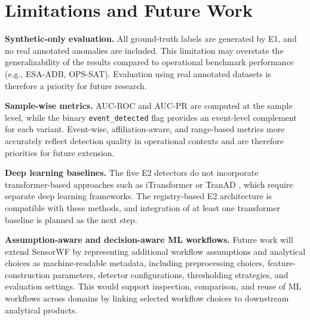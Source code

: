 \documentclass[conference]{IEEEtran}
\begin{document}

\section{Limitations and Future Work}
\label{sec:limitations}

\textbf{Synthetic-only evaluation.} All ground-truth labels are generated by E1, and no real annotated anomalies are included. This limitation may overstate the generalizability of the results compared to operational benchmark performance (e.g., ESA-ADB, OPS-SAT). Evaluation using real annotated datasets is therefore a priority for future research.

\textbf{Sample-wise metrics.} AUC-ROC and AUC-PR are computed at the sample level, while the binary \texttt{event\_detected} flag provides an event-level complement for each variant. Event-wise, affiliation-aware, and range-based metrics \cite{esa_adb2024} more accurately reflect detection quality in operational contexts and are therefore priorities for future extension.

\textbf{Deep learning baselines.} The five E2 detectors do not incorporate transformer-based approaches such as iTransformer \cite{itransformer2024} or TranAD \cite{tuli2022tranad}, which require separate deep learning frameworks. The registry-based E2 architecture is compatible with these methods, and integration of at least one transformer baseline is planned as the next step.

\textbf{Assumption-aware and decision-aware ML workflows.} Future work will extend SensorWF by representing additional workflow assumptions and analytical choices as machine-readable metadata, including preprocessing choices,
feature-construction parameters, detector configurations, thresholding strategies, and evaluation
settings. This would support inspection, comparison, and
reuse of ML workflows across domains by linking selected workflow choices to downstream analytical products.

\end{document}
